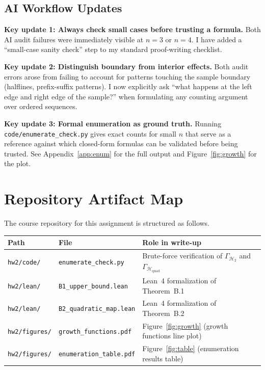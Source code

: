 \documentclass{article}
\begin{document}
\subsection{AI Workflow Updates}
 
\textbf{Key update 1: Always check small cases before trusting a formula.}
Both AI audit failures were immediately visible at $n=3$ or $n=4$.  I have
added a ``small-case sanity check'' step to my standard proof-writing checklist.
 
\textbf{Key update 2: Distinguish boundary from interior effects.}
Both audit errors arose from failing to account for patterns touching the
sample boundary (halflines, prefix-suffix patterns).  I now explicitly ask
``what happens at the left edge and right edge of the sample?'' when
formulating any counting argument over ordered sequences.
 
\textbf{Key update 3: Formal enumeration as ground truth.}
Running \texttt{code/enumerate\_check.py} gives exact counts for small $n$
that serve as a reference against which closed-form formulas can be validated
before being trusted.  See Appendix~\ref{app:enum} for the full output and
Figure~\ref{fig:growth} for the plot.
 
\appendix
 
\section{Repository Artifact Map}
\label{app:artifacts}
 
The course repository for this assignment is structured as follows.
 
\begin{center}
\begin{tabular}{lll}
\toprule
Path & File & Role in write-up \\
\midrule
\texttt{hw2/code/} & \texttt{enumerate\_check.py}  & Brute-force verification of $\Gamma_{\mathcal{H}_2}$ and $\Gamma_{\mathcal{H}_{\mathrm{quad}}}$ \\
\texttt{hw2/lean/} & \texttt{B1\_upper\_bound.lean} & Lean~4 formalization of Theorem~B.1 \\
\texttt{hw2/lean/} & \texttt{B2\_quadratic\_map.lean} & Lean~4 formalization of Theorem~B.2 \\
\texttt{hw2/figures/} & \texttt{growth\_functions.pdf} & Figure~\ref{fig:growth} (growth functions line plot) \\
\texttt{hw2/figures/} & \texttt{enumeration\_table.pdf} & Figure~\ref{fig:table} (enumeration results table) \\
\bottomrule
\end{tabular}
\end{center}
 
\end{document}
